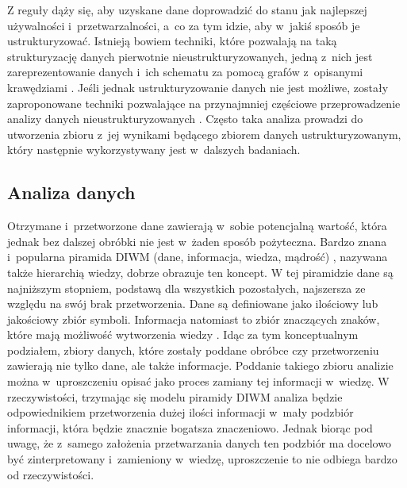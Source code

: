 	Z reguły dąży się, aby uzyskane dane doprowadzić do stanu jak najlepszej używalności i~przetwarzalności, a~co za tym idzie, aby w~jakiś sposób je ustrukturyzować.
	Istnieją bowiem techniki, które pozwalają na taką strukturyzację danych pierwotnie nieustrukturyzowanych, jedną z~nich jest zareprezentowanie danych i~ich schematu za pomocą grafów z~opisanymi krawędziami \cite{buneman1997adding}.
	Jeśli jednak ustrukturyzowanie danych nie jest możliwe, zostały zaproponowane techniki pozwalające na przynajmniej częściowe przeprowadzenie analizy danych nieustrukturyzowanych \cite{boulton1996analysis}.
	Często taka analiza prowadzi do utworzenia zbioru z~jej wynikami będącego zbiorem danych ustrukturyzowanym, który następnie wykorzystywany jest w~dalszych badaniach.

	\subsection{Analiza danych}

	Otrzymane i~przetworzone dane zawierają w~sobie potencjalną wartość, która jednak bez dalszej obróbki nie jest w~żaden sposób pożyteczna.
	Bardzo znana i~popularna piramida DIWM (dane, informacja, wiedza, mądrość) \cite{rowley2007wisdom}, nazywana także hierarchią wiedzy, dobrze obrazuje ten koncept.
	W tej piramidzie dane są najniższym stopniem, podstawą dla wszystkich pozostałych, najszersza ze względu na swój brak przetworzenia.
	Dane są definiowane jako ilościowy lub jakościowy zbiór symboli.
	Informacja natomiast to zbiór znaczących znaków, które mają możliwość wytworzenia wiedzy \cite{zins2007conceptual}.
	Idąc za tym konceptualnym podziałem, zbiory danych, które zostały poddane obróbce czy przetworzeniu zawierają nie tylko dane, ale także informacje.
	Poddanie takiego zbioru analizie można w~uproszczeniu opisać jako proces zamiany tej informacji w~wiedzę.
	W rzeczywistości, trzymając się modelu piramidy DIWM analiza będzie odpowiednikiem przetworzenia dużej ilości informacji w~mały podzbiór informacji, która będzie znacznie bogatsza znaczeniowo.
	Jednak biorąc pod uwagę, że z~samego założenia przetwarzania danych ten podzbiór ma docelowo być zinterpretowany i~zamieniony w~wiedzę, uproszczenie to nie odbiega bardzo od rzeczywistości.

